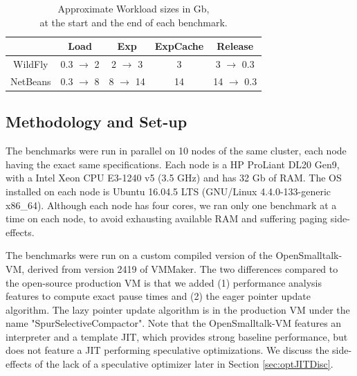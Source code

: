 \documentclass[sigplan,10pt,review,anonymous]{acmart}\settopmatter{printfolios=true,printccs=false,printacmref=false}
\newcommand{\egb}[1]{\color{blue}\fbox{\bfseries\sffamily\scriptsize Elisa:}{\sf\small$\blacktriangleright$\textit{#1}$\blacktriangleleft$}\color{black}}
\newcommand{\eem}[1]{\color{olive}\fbox{\bfseries\sffamily\scriptsize Eliot:}{\sf\small$\blacktriangleright$\textit{#1}$\blacktriangleleft$}\color{black}}
\def\OpenSmalltalkVM{OpenSmalltalk-VM\xspace}
\begin{document}
\begin{table} [th]
\centering
\captionsetup{justification=centering}
\vspace{-0.2cm}
\caption{Approximate Workload sizes in Gb,\\
at the start and the end of each benchmark.\vspace{-0.2cm}}
\begin{tabular}{c|c|c|c|c}
   				& Load 			& Exp 		& \small{ExpCache}	& Release \\
	\hline
   	WildFly		& 0.3 $\rightarrow$ 2 	& 2 $\rightarrow$ 3	& 3 		& 3 $\rightarrow$ 0.3 \\
   	NetBeans		& 0.3 $\rightarrow$ 8 	& 8 $\rightarrow$ 14 	& 14 		& 14 $\rightarrow$ 0.3 \\
\end{tabular} 
\vspace{-0.4cm}
\label{tab:workloadSize}
\end{table}

\subsection{Methodology and Set-up}

\def\numRuns{30\xspace}

The benchmarks were run in parallel on 10 nodes of the same cluster, each node having the exact same specifications. Each node is a HP ProLiant DL20 Gen9, with a Intel Xeon CPU E3-1240 v5 (3.5 GHz) and has 32 Gb of RAM. The OS installed on each node is Ubuntu 16.04.5 LTS (GNU/Linux 4.4.0-133-generic x86\_64). Although each node has four cores, we ran only one benchmark at a time on each node, to avoid exhausting available RAM and suffering paging side-effects.

The benchmarks were run on a custom compiled version of the \OpenSmalltalkVM, derived from version 2419 of VMMaker. The two differences compared to the open-source production VM is that we added (1) performance analysis features to compute exact pause times and (2) the eager pointer update algorithm. 
The lazy pointer update algorithm is in the production VM under the name "SpurSelectiveCompactor". 
Note that the \OpenSmalltalkVM features an interpreter and a template JIT, which provides strong baseline performance, but does not feature a JIT performing speculative optimizations. We discuss the side-effects of the lack of a speculative optimizer later in Section \ref{sec:optJITDisc}.
\end{document}
